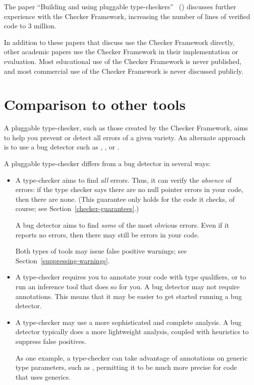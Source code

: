 The paper ``Building and using pluggable type-checkers''~\cite{DietlDEMS2011}
()
discusses further experience with the Checker Framework, increasing the
number of lines of verified code to 3 million.

In addition to these papers that discuss use the Checker Framework
directly, other academic papers use the Checker Framework in their
implementation or evaluation.  Most educational use of the Checker
Framework is never published, and most commercial use of the Checker
Framework is never discussed publicly.


\section{Comparison to other tools\label{other-tools}}

A pluggable type-checker, such as those created by the Checker Framework,
aims to help you prevent or detect all errors of a given variety.  An
alternate approach is to use a bug detector such as
,
, or
.

A pluggable type-checker
differs from a bug detector in several ways:
\begin{itemize}
\item
  A type-checker aims to find \emph{all} errors.  Thus, it can verify the
  \emph{absence} of errors:  if the type checker says there are no null
  pointer errors in your code, then there are none.  (This guarantee only
  holds for the code it checks, of course; see
  Section~\ref{checker-guarantees}.)

  A bug detector aims to find \emph{some} of the most obvious errors.  Even
  if it reports no errors, then there may still be errors in your code.

  Both types of tools may issue false positive warnings; see
  Section~\ref{suppressing-warnings}.

\item
  A type-checker requires you to annotate your code with type qualifiers,
  or to run an inference tool that does so for you.  A bug detector may not
  require annotations.  This means that it may be easier to get started
  running a bug detector.

\item
  A type-checker may use a more sophisticated and complete analysis.
  A bug detector typically does a more lightweight analysis, coupled with
  heuristics to suppress false positives.

  As one example, a type-checker can take advantage of annotations on
  generic type parameters, such as , permitting
  it to be much more precise for code that uses generics.

\end{itemize}

